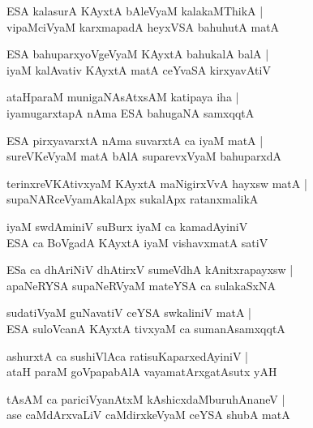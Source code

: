 \documentclass[twoside,12pt,openright]{book}
\newcounter{shloka}[chapter]
\begin{document}
\begin{shloka}%
ESA kalasurA KAyxtA bAleVyaM kalakaMThikA |\\
vipaMciVyaM karxmapadA heyxVSA bahuhutA matA 
\end{shloka}

\begin{shloka}%
ESA bahuparxyoVgeVyaM KAyxtA bahukalA balA |\\
iyaM kalAvativ KAyxtA matA ceYvaSA kirxyavAtiV 
\end{shloka}

\begin{shloka}%
ataHparaM munigaNAsAtxsAM katipaya iha |\\
iyamugarxtapA nAma ESA bahugaNA samxqqtA 
\end{shloka}

\begin{shloka}%
ESA pirxyavarxtA nAma suvarxtA ca iyaM matA |\\
sureVKeVyaM matA bAlA suparevxVyaM bahuparxdA 
\end{shloka}

\begin{shloka}%
terinxreVKAtivxyaM KAyxtA maNigirxVvA hayxsw matA |\\
supaNARceVyamAkalApx sukalApx ratanxmalikA 
\end{shloka}

\begin{shloka}%
iyaM swdAminiV suBurx iyaM ca kamadAyiniV \\
ESA ca BoVgadA KAyxtA iyaM vishavxmatA satiV 
\end{shloka}

\begin{shloka}%
ESa ca dhAriNiV dhAtirxV sumeVdhA kAnitxrapayxsw |\\
apaNeRYSA supaNeRVyaM mateYSA ca sulakaSxNA 
\end{shloka}

\begin{shloka}%
sudatiVyaM guNavatiV ceYSA swkaliniV matA |\\
ESA suloVcanA KAyxtA tivxyaM ca sumanAsamxqqtA 
\end{shloka}

\begin{shloka}%
ashurxtA ca sushiVlAca ratisuKaparxedAyiniV |\\
ataH paraM goVpapabAlA vayamatArxgatAsutx yAH 
\end{shloka}

\begin{shloka}%
tAsAM ca pariciVyanAtxM kAshicxdaMburuhAnaneV |\\
ase caMdArxvaLiV caMdirxkeVyaM ceYSA shubA matA 
\end{shloka}
\end{document}
